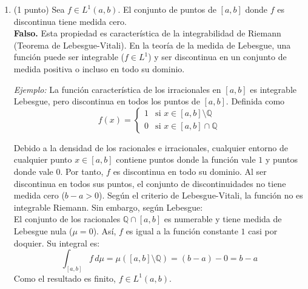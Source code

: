 \documentclass[12pt]{article}
\begin{document}
\begin{ejercicio}
\begin{enumerate}
            \item (1 punto) Sea $f \in L^1(a, b)$. El conjunto de puntos de $[a, b]$ donde $f$ es discontinua tiene medida cero. \\
            \textbf{Falso.} Esta propiedad es característica de la integrabilidad de Riemann (Teorema de Lebesgue-Vitali). En la teoría de la medida de Lebesgue, una función puede ser integrable ($f \in L^1$) y ser discontinua en un conjunto de medida positiva o incluso en todo su dominio.
            
            \textit{Ejemplo:} La función característica de los irracionales en $[a, b]$ es integrable Lebesgue, pero discontinua en todos los puntos de $[a, b]$. Definida como 
            $$ f(x) = \begin{cases} 
            1 & \text{si } x \in [a, b] \setminus \mathbb{Q} \\ 
            0 & \text{si } x \in [a, b] \cap \mathbb{Q} 
            \end{cases}$$
            
            Debido a la densidad de los racionales e irracionales, cualquier entorno de cualquier punto $x \in [a, b]$ contiene puntos donde la función vale $1$ y puntos donde vale $0$. Por tanto, $f$ es discontinua en todo su dominio. Al ser discontinua en todos sus puntos, el conjunto de discontinuidades no tiene medida cero ($b-a > 0$). Según el criterio de Lebesgue-Vitali, la función no es integrable Riemann. Sin embargo, según Lebesgue: \\
            
            El conjunto de los racionales $\mathbb{Q} \cap [a, b]$ es numerable y tiene medida de Lebesgue nula ($\mu=0$). Así, $f$ es igual a la función constante $1$ casi por doquier. Su integral es:
            $$ \int_{[a, b]} f \, d\mu = \mu([a, b] \setminus \mathbb{Q}) = (b - a) - 0 = b - a $$
            Como el resultado es finito, $f \in L^1(a, b)$.
        \end{enumerate}
    \end{ejercicio}
\end{document}
